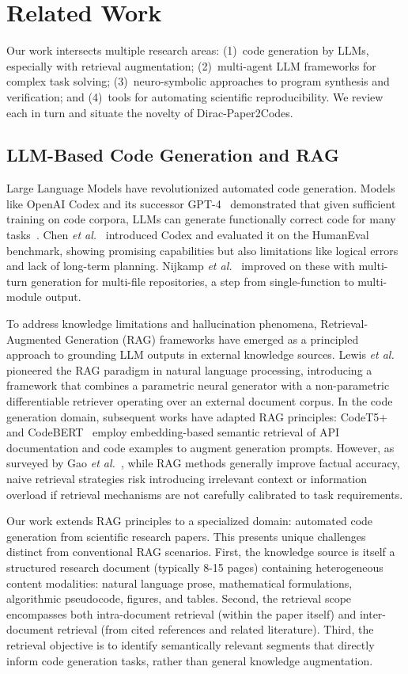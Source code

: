 \documentclass{ieeeaccess}
\begin{document}
\section{Related Work}\label{sec:related}
Our work intersects multiple research areas: (1)~code generation by LLMs, especially with retrieval augmentation; (2)~multi-agent LLM frameworks for complex task solving; (3)~neuro-symbolic approaches to program synthesis and verification; and (4)~tools for automating scientific reproducibility. We review each in turn and situate the novelty of Dirac-Paper2Codes.

\subsection{LLM-Based Code Generation and RAG}
Large Language Models have revolutionized automated code generation. Models like OpenAI Codex and its successor GPT-4~\cite{openai2024gpt4} demonstrated that given sufficient training on code corpora, LLMs can generate functionally correct code for many tasks~\cite{chen2021evaluating}. Chen \emph{et al.}~\cite{chen2021evaluating} introduced Codex and evaluated it on the HumanEval benchmark, showing promising capabilities but also limitations like logical errors and lack of long-term planning. Nijkamp \emph{et al.}~\cite{nijkamp2023codegen} improved on these with multi-turn generation for multi-file repositories, a step from single-function to multi-module output.

To address knowledge limitations and hallucination phenomena, Retrieval-Augmented Generation (RAG) frameworks have emerged as a principled approach to grounding LLM outputs in external knowledge sources. Lewis \emph{et al.}~\cite{lewis2020rag} pioneered the RAG paradigm in natural language processing, introducing a framework that combines a parametric neural generator with a non-parametric differentiable retriever operating over an external document corpus. In the code generation domain, subsequent works have adapted RAG principles: CodeT5+~\cite{wang2021codet5} and CodeBERT~\cite{feng2020codebert} employ embedding-based semantic retrieval of API documentation and code examples to augment generation prompts. However, as surveyed by Gao \emph{et al.}~\cite{gao2023rag}, while RAG methods generally improve factual accuracy, naive retrieval strategies risk introducing irrelevant context or information overload if retrieval mechanisms are not carefully calibrated to task requirements.

Our work extends RAG principles to a specialized domain: automated code generation from scientific research papers. This presents unique challenges distinct from conventional RAG scenarios. First, the knowledge source is itself a structured research document (typically 8-15 pages) containing heterogeneous content modalities: natural language prose, mathematical formulations, algorithmic pseudocode, figures, and tables. Second, the retrieval scope encompasses both intra-document retrieval (within the paper itself) and inter-document retrieval (from cited references and related literature). Third, the retrieval objective is to identify semantically relevant segments that directly inform code generation tasks, rather than general knowledge augmentation.
\end{document}
